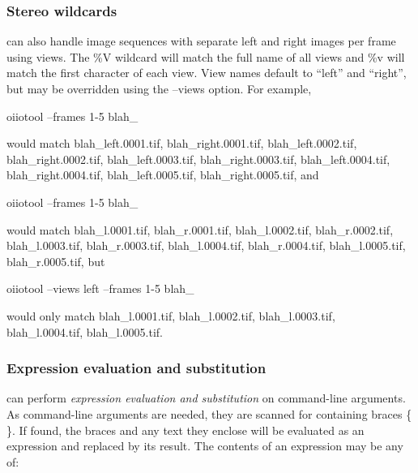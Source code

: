 \subsubsection*{Stereo wildcards}

\oiiotool can also handle image sequences with separate left and right
images per frame using {\cf views}. The {\cf \%V} wildcard will match
the full name of all views and {\cf \%v} will match the first character
of each view. View names default to ``left'' and ``right'', but may
be overridden using the {\cf --views} option.
For example,
\begin{code}
    oiiotool --frames 1-5 blah_%
\end{code}
\noindent would match {\cf blah_left.0001.tif}, {\cf blah_right.0001.tif},
{\cf blah_left.0002.tif}, {\cf blah_right.0002.tif}, {\cf blah_left.0003.tif},
{\cf blah_right.0003.tif}, {\cf blah_left.0004.tif}, 
{\cf blah_right.0004.tif}, {\cf blah_left.0005.tif}, 
{\cf blah_right.0005.tif}, and
\begin{code}
    oiiotool --frames 1-5 blah_%
\end{code}
\noindent would match {\cf blah_l.0001.tif}, {\cf blah_r.0001.tif},
{\cf blah_l.0002.tif}, {\cf blah_r.0002.tif}, {\cf blah_l.0003.tif},
{\cf blah_r.0003.tif}, {\cf blah_l.0004.tif}, {\cf blah_r.0004.tif}, 
{\cf blah_l.0005.tif}, {\cf blah_r.0005.tif}, but
\begin{code}
    oiiotool --views left --frames 1-5 blah_%
\end{code}
\noindent would only match {\cf blah_l.0001.tif}, {\cf blah_l.0002.tif},
{\cf blah_l.0003.tif}, {\cf blah_l.0004.tif}, {\cf blah_l.0005.tif}.

\subsubsection*{Expression evaluation and substitution}
\label{oiiotoolexpr}

\oiiotool can perform \emph{expression evaluation and substitution} on
command-line arguments. As command-line arguments are needed, they are
scanned for containing braces {\cf \{ \}}. If found, the braces and any
text they enclose will be evaluated as an expression and replaced by its
result. The contents of an expression may be any of:

